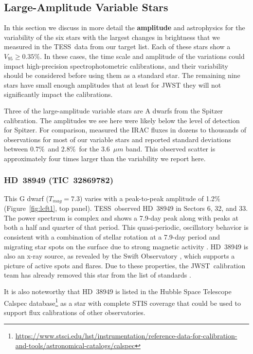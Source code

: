 \documentclass[twocolumn, linenumbers]{aastex631}
\newcommand{\jwst}{JWST}
\newcommand{\tess}{TESS}
\begin{document}
\subsection{Large-Amplitude Variable Stars} %


In this section we discuss in more detail the \textbf{amplitude} and astrophysics for the variability of the six stars with the largest changes in brightness that we measured in the \tess\ data from our target list. Each of these stars show a $V_{95}\ge0.35$\%. In these cases, the time scale and amplitude of the variations could impact high-precision spectrophotometric calibrations, and their variability should be considered before using them as a standard star. The remaining nine stars have small enough amplitudes that at least for JWST they will not significantly impact the calibrations. 

Three of the large-amplitude variable stars are A dwarfs from the \citet{Reach2005} Spitzer calibration. The amplitudes we see here were likely below the level of detection for Spitzer. For comparison, \citet{Krick2021IRAC} measured the IRAC fluxes in dozens to thousands of observations for most of our variable stars and reported standard deviations between 0.7\%\ and 2.8\%\ for the 3.6~$\mu m$ band.  This observed scatter is approximately four times larger than the variability we report here.


\subsubsection{HD~38949 (TIC~32869782)}

This G dwarf ($T_{mag}=7.3$) varies with a peak-to-peak amplitude of 1.2\% (Figure~\ref{fig:lcft1}, top panel). \tess\ observed HD~38949 in Sectors 6, 32, and 33.  The power spectrum is complex and shows a 7.9-day peak along with peaks at both a half and quarter of that period. This quasi-periodic, oscillatory behavior is consistent with a combination of stellar rotation at a 7.9-day period and migrating star spots on the surface due to strong magnetic activity \citep{Santos2021}.  HD~38949 is also an x-ray source, as revealed by the Swift Observatory \citep{Swift2020,Evans2020vizier}, which supports a picture of active spots and flares. Due to these properties, the \jwst\ calibration team has already removed this star from the list of standards \citep{Gordon2022inprep}.

It is also noteworthy that HD~38949 is listed in the Hubble Space Telescope Calspec database\footnote{\url{https://www.stsci.edu/hst/instrumentation/reference-data-for-calibration-and-tools/astronomical-catalogs/calspec}} \citep{Bohlin2014PASP126} as a star with complete STIS coverage that could be used to support flux calibrations of other observatories.
\end{document}
